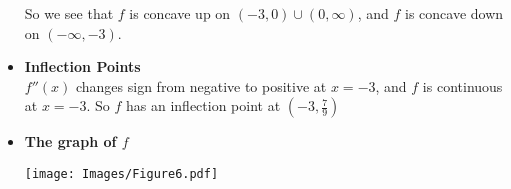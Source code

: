 \documentclass[nooutcomes]{ximera}
\renewenvironment{freeResponse}{
\ifhandout\setbox0\vbox\bgroup\else
\begin{trivlist}\item[\hskip \labelsep\bfseries Solution:\hspace{2ex}]
\fi}
{\ifhandout\egroup\else
\end{trivlist}
\fi}
\newcommand{\dfn}{\textbf}
\begin{document}
\begin{problem}
\begin{freeResponse}
\begin{itemize}
       So we see that $f$ is concave up on $(-3,0) \cup (0,\infty)$, and $f$ is concave down on $(-\infty, -3)$.
     \item
       \dfn{Inflection Points}  \\
       $f''(x)$ changes sign from negative to positive at $x=-3$, and $f$ is continuous at $x=-3$.
       So $f$ has an inflection point at $\left( -3, \frac{7}{9} \right)$
			
       \newpage

     \item
       \dfn{The graph of $f$}
       \begin{image}
         \texttt{[image: Images/Figure6.pdf]}
       \end{image}

    \end{itemize}
  \end{freeResponse}
\end{problem}
\end{document}
